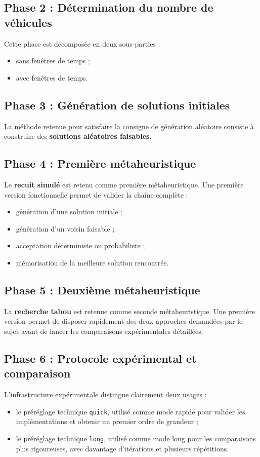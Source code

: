 \documentclass[11pt,a4paper]{article}
\newcommand{\og}{%
  \ifmmode\langle\else\guillemotleft\nobreak\fi}
\newcommand{\fg}{%
  \ifmmode\rangle\else\nobreak\guillemotright\fi}
\begin{document}
\subsection{Phase 2 : Détermination du nombre de véhicules}
Cette phase est décomposée en deux sous-parties :
\begin{itemize}
    \item sans fenêtres de temps ;
    \item avec fenêtres de temps.
\end{itemize}

\subsection{Phase 3 : Génération de solutions initiales}
La méthode retenue pour satisfaire la consigne de génération aléatoire consiste à construire des \textbf{solutions aléatoires faisables}.

\subsection{Phase 4 : Première métaheuristique}
Le \textbf{recuit simulé} est retenu comme première métaheuristique. Une première version fonctionnelle permet de valider la chaîne complète :
\begin{itemize}
    \item génération d'une solution initiale ;
    \item génération d'un voisin faisable ;
    \item acceptation déterministe ou probabiliste ;
    \item mémorisation de la meilleure solution rencontrée.
\end{itemize}

\subsection{Phase 5 : Deuxième métaheuristique}
La \textbf{recherche tabou} est retenue comme seconde métaheuristique. Une première version permet de disposer rapidement des deux approches demandées par le sujet avant de lancer les comparaisons expérimentales détaillées.

\subsection{Phase 6 : Protocole expérimental et comparaison}
L'infrastructure expérimentale distingue clairement deux usages :
\begin{itemize}
    \item le préréglage technique \texttt{quick}, utilisé comme \og mode rapide \fg{} pour valider les implémentations et obtenir un premier ordre de grandeur ;
    \item le préréglage technique \texttt{long}, utilisé comme \og mode long \fg{} pour les comparaisons plus rigoureuses, avec davantage d'itérations et plusieurs répétitions.
\end{itemize}
\end{document}

